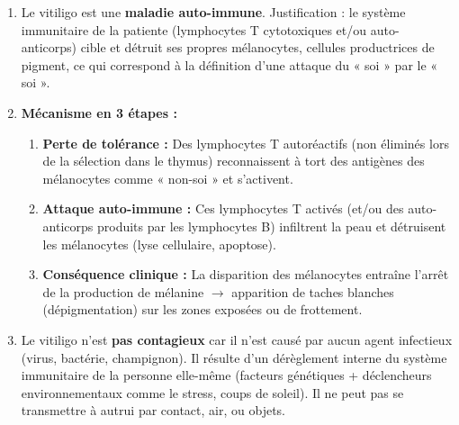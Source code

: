 \documentclass[11pt]{article}
\newcounter{popsec}
\newcounter{popsub}
\newcommand{\courssub}[1]{%
  \stepcounter{popsub}%
  \par\vspace{9pt}\noindent{\popxbold\fontsize{11.5}{13}\selectfont\color{popink}{\color{poporange}\thepopsec.\thepopsub}\hspace{6pt}#1}\par\nopagebreak\vspace{4pt}
}
\begin{document}
\courssub{Je m'entraîne}

\begin{corrige}
\begin{enumerate}
\item Le vitiligo est une \textbf{maladie auto-immune}. Justification : le système immunitaire de la patiente (lymphocytes T cytotoxiques et/ou auto-anticorps) cible et détruit ses propres mélanocytes, cellules productrices de pigment, ce qui correspond à la définition d'une attaque du « soi » par le « soi ».
\item \textbf{Mécanisme en 3 étapes :}
\begin{enumerate}
\item \textbf{Perte de tolérance :} Des lymphocytes T autoréactifs (non éliminés lors de la sélection dans le thymus) reconnaissent à tort des antigènes des mélanocytes comme « non-soi » et s'activent.
\item \textbf{Attaque auto-immune :} Ces lymphocytes T activés (et/ou des auto-anticorps produits par les lymphocytes B) infiltrent la peau et détruisent les mélanocytes (lyse cellulaire, apoptose).
\item \textbf{Conséquence clinique :} La disparition des mélanocytes entraîne l'arrêt de la production de mélanine $\rightarrow$ apparition de taches blanches (dépigmentation) sur les zones exposées ou de frottement.
\end{enumerate}
\item Le vitiligo n'est \textbf{pas contagieux} car il n'est causé par aucun agent infectieux (virus, bactérie, champignon). Il résulte d'un dérèglement interne du système immunitaire de la personne elle-même (facteurs génétiques + déclencheurs environnementaux comme le stress, coups de soleil). Il ne peut pas se transmettre à autrui par contact, air, ou objets.
\end{enumerate}
\end{corrige}
\end{document}
